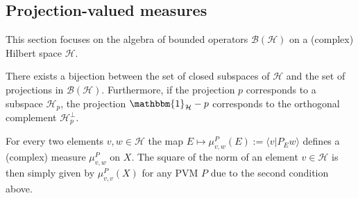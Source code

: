 \subsection{Projection-valued measures}

    This section focuses on the algebra of bounded operators $\mathcal{B}(\mathcal{H})$ on a (complex) Hilbert space $\mathcal{H}$.

    \begin{property}
        There exists a bijection between the set of closed subspaces of $\mathcal{H}$ and the set of projections in $\mathcal{B}(\mathcal{H})$. Furthermore, if the projection $p$ corresponds to a subspace $\mathcal{H}_p$, the projection $\mathbbm{1}_{\mathcal{H}}-p$ corresponds to the orthogonal complement $\mathcal{H}_p^\perp$.
    \end{property}

    \begin{property}
        For every two elements $v,w\in\mathcal{H}$ the map $E\mapsto\mu^P_{v,w}(E):=\langle v|P_Ew \rangle$ defines a (complex) measure $\mu^P_{v,w}$ on $X$. The square of the norm of an element $v\in\mathcal{H}$ is then simply given by $\mu^P_{v,v}(X)$ for any PVM $P$ due to the second condition above.
    \end{property}

